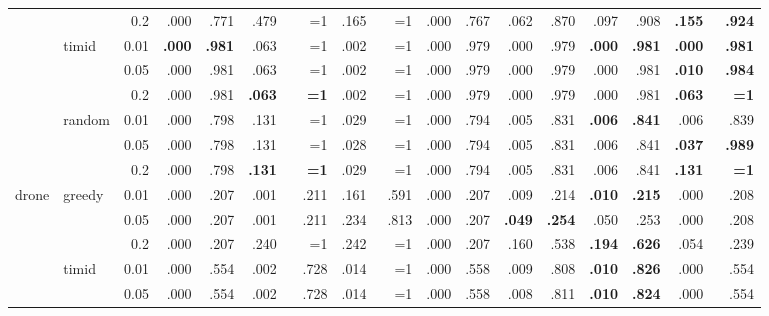 \documentclass{article}
\begin{document}
\begin{table}[h]
{\begin{tabular}{l@{\hskip 12pt} l@{\hskip 12pt} r@{\hskip 12pt} rr@{\hskip 12pt} rr@{\hskip 12pt} rr@{\hskip 12pt} rr@{\hskip 12pt} rr@{\hskip 12pt} rr@{\hskip 12pt} rr@{\hskip 12pt}}
 &  & 0.2 & .000 & .771 & \cellcolor{red!20}.479 & \cellcolor{red!20}~~{=}1 & .165 & ~~{=}1 & .000 & .767 & .062 & .870 & .097 & .908 & \textbf{.155} & \textbf{.924} \\
 \cmidrule(lr){2-17}
 & \multirow{3}{*}{timid} & 0.01 & \textbf{.000} & \textbf{.981} & \cellcolor{red!20}.063 & \cellcolor{red!20}~~{=}1 & .002 & ~~{=}1 & .000 & .979 & .000 & .979 & \textbf{.000} & \textbf{.981} & \textbf{.000} & \textbf{.981} \\
 &  & 0.05 & .000 & .981 & \cellcolor{red!20}.063 & \cellcolor{red!20}~~{=}1 & .002 & ~~{=}1 & .000 & .979 & .000 & .979 & .000 & .981 & \textbf{.010} & \textbf{.984} \\
 &  & 0.2 & .000 & .981 & \textbf{.063} & \textbf{~~{=}1} & .002 & ~~{=}1 & .000 & .979 & .000 & .979 & .000 & .981 & \textbf{.063} & \textbf{~~{=}1} \\
 \cmidrule(lr){2-17}
 & \multirow{3}{*}{random} & 0.01 & .000 & .798 & \cellcolor{red!20}.131 & \cellcolor{red!20}~~{=}1 & \cellcolor{red!20}.029 & \cellcolor{red!20}~~{=}1 & .000 & .794 & .005 & .831 & \textbf{.006} & \textbf{.841} & .006 & .839 \\
 &  & 0.05 & .000 & .798 & \cellcolor{red!20}.131 & \cellcolor{red!20}~~{=}1 & .028 & ~~{=}1 & .000 & .794 & .005 & .831 & .006 & .841 & \textbf{.037} & \textbf{.989} \\
 &  & 0.2 & .000 & .798 & \textbf{.131} & \textbf{~~{=}1} & .029 & ~~{=}1 & .000 & .794 & .005 & .831 & .006 & .841 & \textbf{.131} & \textbf{~~{=}1} \\
 \cmidrule(lr){1-17}
\multirow{9}{*}{drone} & \multirow{3}{*}{greedy} & 0.01 & .000 & .207 & .001 & .211 & \cellcolor{red!20}.161 & \cellcolor{red!20}.591 & .000 & .207 & .009 & .214 & \textbf{.010} & \textbf{.215} & .000 & .208 \\
 &  & 0.05 & .000 & .207 & .001 & .211 & \cellcolor{red!20}.234 & \cellcolor{red!20}.813 & .000 & .207 & \textbf{.049} & \textbf{.254} & .050 & .253 & .000 & .208 \\
 &  & 0.2 & .000 & .207 & \cellcolor{red!20}.240 & \cellcolor{red!20}~~{=}1 & \cellcolor{red!20}.242 & \cellcolor{red!20}~~{=}1 & .000 & .207 & .160 & .538 & \textbf{.194} & \textbf{.626} & .054 & .239 \\
 \cmidrule(lr){2-17}
 & \multirow{3}{*}{timid} & 0.01 & .000 & .554 & .002 & .728 & \cellcolor{red!20}.014 & \cellcolor{red!20}~~{=}1 & .000 & .558 & .009 & .808 & \textbf{.010} & \textbf{.826} & .000 & .554 \\
 &  & 0.05 & .000 & .554 & .002 & .728 & .014 & ~~{=}1 & .000 & .558 & .008 & .811 & \textbf{.010} & \textbf{.824} & .000 & .554 \\

\end{tabular}}
\end{table}
\end{document}
